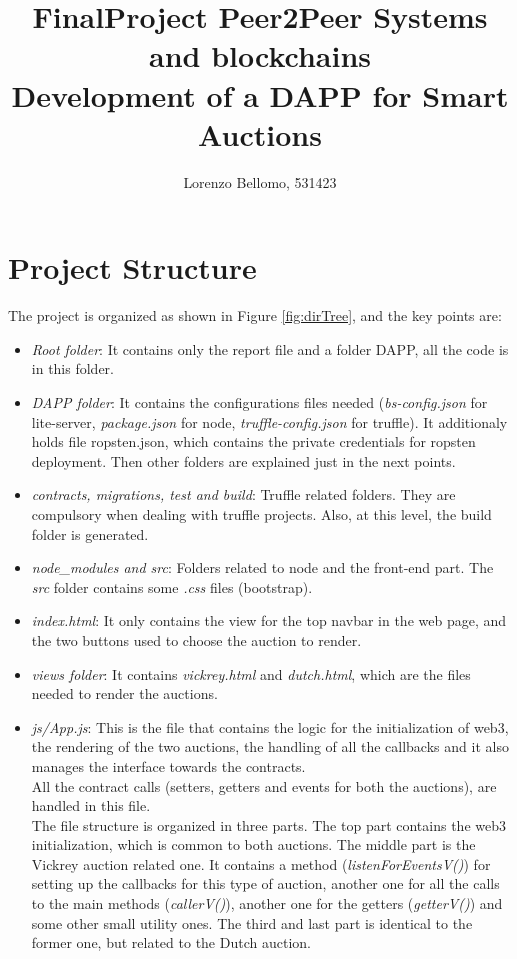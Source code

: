 \documentclass[11pt, a4paper]{report}
\title{
	FinalProject Peer2Peer Systems and blockchains \\
	\large Development of a DAPP for Smart Auctions}
\author{Lorenzo Bellomo, 531423}
\date{}
\begin{document}
	\maketitle
	
\section*{Project Structure}
The project is organized as shown in Figure \ref{fig:dirTree}, and the key points are:
\begin{itemize}
	\item \emph{Root folder}: It contains only the report file and a folder DAPP, all the code is in this folder.
	\item \emph{DAPP folder}: It contains the configurations files needed (\emph{bs-config.json} for lite-server, \emph{package.json} for node, \emph{truffle-config.json} for truffle). It additionaly holds file ropsten.json, which contains the private credentials for ropsten deployment. Then other folders are explained just in the next points.
	\item \emph{contracts, migrations, test and build}: Truffle related folders. They are compulsory when dealing with truffle projects. Also, at this level, the build folder is generated.
	\item \emph{node\_modules and src}: Folders related to node and the front-end part. The \emph{src} folder contains some \emph{.css} files (bootstrap).
	\item \emph{index.html}: It only contains the view for the top navbar in the web page, and the two buttons used to choose the auction to render.
	\item \emph{views folder}: It contains \emph{vickrey.html} and \emph{dutch.html}, which are the files needed to render the auctions.
	\item \emph{js/App.js}: This is the file that contains the logic for the initialization of web3, the rendering of the two auctions, the handling of all the callbacks and it also manages the interface towards the contracts. \\All the contract calls (setters, getters and events for both the auctions), are handled in this file.\\ The file structure is organized in three parts. The top part contains the web3 initialization, which is common to both auctions. The middle part is the Vickrey auction related one. It contains a method (\emph{listenForEventsV()}) for setting up the callbacks for this type of auction, another one for all the calls to the main methods (\emph{callerV()}), another one for the getters (\emph{getterV()}) and some other small utility ones. The third and last part is identical to the former one, but related to the Dutch auction.

\end{itemize}
\end{document}
